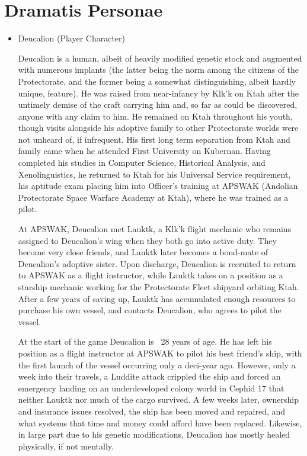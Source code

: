 \label{chapt:PCplots}
\section{Dramatis Personae}
\begin{itemize}
\item Deucalion (Player Character)

Deucalion is a human, albeit of heavily modified genetic stock and
augmented with numerous implants (the latter being the norm among the
citizens of the Protectorate, and the former being a somewhat
distinguishing, albeit hardly unique, feature). He was raised from
near-infancy by Klk'k on Ktah after the untimely demise of the craft
carrying him and, so far as could be discovered, anyone with any claim
to him.  He remained on Ktah throughout his youth, though visits
alongside his adoptive family to other Protectorate worlds were not
unheard of, if infrequent.  His first long term separation from Ktah
and family came when he attended First University on Kubernan. Having
completed his studies in Computer Science, Historical Analysis, and
Xenolinguistics, he returned to Ktah for his Universal Service
requirement, his aptitude exam placing him into Officer's training at
APSWAK (Andolian Protectorate Space Warfare Academy at Ktah), where he
was trained as a pilot.

At APSWAK, Deucalion met Lauktk, a Klk'k flight mechanic who remains
assigned to Deucalion's wing when they both go into active duty.  They
become very close friends, and Lauktk later becomes a bond-mate of
Deucalion's adoptive sister.  Upon discharge, Deucalion is recruited
to return to APSWAK as a flight instructor, while Lauktk takes on a
position as a starship mechanic working for the Protectorate Fleet
shipyard orbiting Ktah.  After a few years of saving up, Lauktk has
accumulated enough resources to purchase his own vessel, and contacts
Deucalion, who agrees to pilot the vessel.

At the start of the game Deucalion is ~28 years of age.  He has left
his position as a flight instructor at APSWAK to pilot his best
friend's ship, with the first launch of the vessel occurring only a
deci-year ago. However, only a week into their travels, a Luddite
attack crippled the ship and forced an emergency landing on an
underdeveloped colony world in Cephid 17 that neither Lauktk nor much
of the cargo survived. A few weeks later, ownership and insurance
issues resolved, the ship has been moved and repaired, and what
systems that time and money could afford have been replaced. Likewise,
in large part due to his genetic modifications, Deucalion has mostly
healed physically, if not mentally.


\end{itemize}
